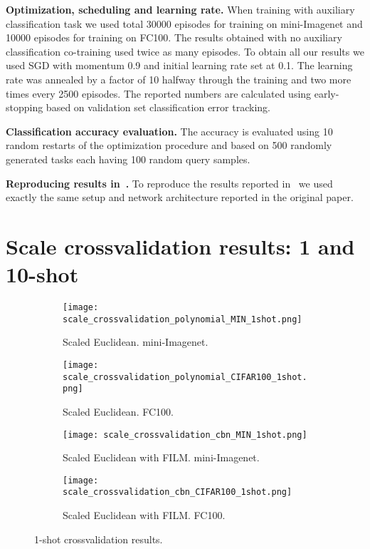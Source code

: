\documentclass{article}
\begin{document}
\textbf{Optimization, scheduling and learning rate.} When training with auxiliary classification task we used total 30000 episodes for training on mini-Imagenet and 10000 episodes for training on FC100. The results obtained with no auxiliary classification co-training used twice as many episodes. To obtain all our results we used SGD with momentum 0.9 and initial learning rate set at 0.1. The learning rate was annealed by a factor of 10 halfway through the training and two more times every 2500 episodes. The reported numbers are calculated using early-stopping based on validation set classification error tracking.

\textbf{Classification accuracy evaluation.} The accuracy is evaluated using 10 random restarts of the optimization procedure and based on 500 randomly generated tasks each having 100 random query samples.

\textbf{Reproducing results in~\citep{snell2017prototypical}.} To reproduce the results reported in~\citep{snell2017prototypical} we used exactly the same setup and network architecture reported in the original paper.







\iffalse

\section{Scale crossvalidation results: 1 and 10-shot} \label{sec:one_shot_alpha_results}

\begin{figure}[t]
\centering
    \begin{subfigure}[t]{0.49\textwidth}
        \texttt{[image: scale\_crossvalidation\_polynomial\_MIN\_1shot.png]}
        \caption{Scaled Euclidean. mini-Imagenet.}
        \label{fig:scaled_euclidean_miniimagenet_1shot}
    \end{subfigure}
    \begin{subfigure}[t]{0.49\textwidth}
        \texttt{[image: scale\_crossvalidation\_polynomial\_CIFAR100\_1shot.png]}
        \caption{Scaled Euclidean. FC100.}
        \label{fig:scaled_euclidean_cifar100_1shot}
    \end{subfigure}
    \begin{subfigure}[t]{0.49\textwidth}
        \texttt{[image: scale\_crossvalidation\_cbn\_MIN\_1shot.png]}
        \caption{Scaled Euclidean with FILM. mini-Imagenet.}
        \label{fig:scaled_euclidean_with_tbn_miniimagenet_1shot}
    \end{subfigure}
    \begin{subfigure}[t]{0.49\textwidth}
        \texttt{[image: scale\_crossvalidation\_cbn\_CIFAR100\_1shot.png]}
        \caption{Scaled Euclidean with FILM. FC100.}
        \label{fig:scaled_euclidean_with_tbn_cifar100_1shot}
    \end{subfigure}
    \caption{1-shot  crossvalidation results.}
    \label{fig:metric_scaling_1shot}
\end{figure}
\end{document}
